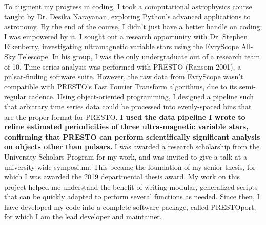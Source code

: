\documentclass[11pt]{article}
\begin{document}
To augment my progress in coding, I took a computational astrophysics course taught by Dr. Desika Narayanan, exploring Python's advanced applications to astronomy. By the end of the course, I didn't just have a better handle on coding; I was empowered by it. I sought out a research opportunity with Dr. Stephen Eikenberry, investigating ultramagnetic variable stars using the EvryScope All-Sky Telescope. In his group, I was the only undergraduate out of a research team of 10. Time-series analysis was performed with PRESTO (Ransom 2001), a pulsar-finding software suite. However, the raw data from EvryScope wasn't compatible with PRESTO's Fast Fourier Transform algorithms, due to its semi-regular cadence. Using object-oriented programming, I designed a pipeline such that arbitrary time series data could be processed into evenly-spaced bins that are the proper format for PRESTO. \textbf{I used the data pipeline I wrote to refine estimated periodicities of three ultra-magnetic variable stars, confirming that PRESTO can perform scientifically significant analysis on objects other than pulsars.} I was awarded a research scholarship from the University Scholars Program for my work, and was invited to give a talk at a university-wide symposium. This became the foundation of my senior thesis, for which I was awarded the 2019 departmental thesis award. My work on this project helped me understand the benefit of writing modular, generalized scripts that can be quickly adapted to perform several functions as needed. Since then, I have developed my code into a complete software package, called PRESTOport, for which I am the lead developer and maintainer.
\end{document}
